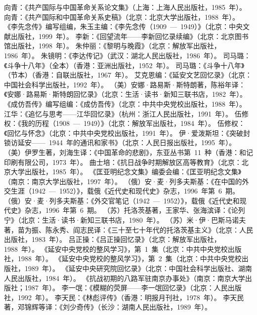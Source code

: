 \begin{thebibliography}{999}
\bibitem{}向青：《共产国际与中国革命关系论文集》（上海：上海人民出版社，1985~年）。
\bibitem{}向青：《共产国际和中国革命关系史稿》（北京：北京大学出版社，1988~年）。
\bibitem{}《李先念传》编写组编，朱玉主编：《李先念传（1909~—~1949）》（北京：中央文献出版社，1999~年）。
\bibitem{}李新：《回望流年——李新回忆录续编》（北京：北京图书馆出版社，1998~年）。
\bibitem{}朱仲丽：《黎明与晚霞》（北京：解放军出版社，1986~年）。
\bibitem{}朱镜明：《李达传记》（武汉：湖北人民出版社，1986~年）。
\bibitem{}司马璐：《斗争十八年》（全本）（香港：亚洲出版社，1952~年）。
\bibitem{}司马璐：《斗争十八年》（节本）（香港：自联出版社，1967~年）。
\bibitem{}艾克恩编：《延安文艺回忆录》（北京：中国社会科学出版社，1992~年）。
\bibitem{}（美）安娜·路易斯·斯特朗著，陈裕年译：《安娜·路易斯·斯特朗回忆录》（北京：生活·读书·新知三联书店，1982~年）。
\bibitem{}《成仿吾传》编写组编：《成仿吾传》（北京：中共中央党校出版社，1988~年）。
\bibitem{}江华：《追忆与思考——江华回忆录》（杭州：浙江人民出版社，1991~年）。
\bibitem{}伍修权：《我的历程（1908~—~1949）》（北京：解放军出版社，1984~年）。
\bibitem{}伍修权：《回忆与怀念》（北京：中共中央党校出版社，1991~年）。
\bibitem{}伊·爱泼斯坦：《突破封锁访延安——~1944~年的通讯和家书》（北京：人民日报出版社，1995~年）。
\bibitem{}（美）伊罗生著，刘海生译：《中国革命的悲剧》，东亚丛书第~11~种（香港：和记印刷有限公司，1973~年）。
\bibitem{}曲士培：《抗日战争时期解放区高等教育》（北京：北京大学出版社，1985~年）。
\bibitem{}《匡亚明纪念文集》编委会编：《匡亚明纪念文集》（南京：南京大学出版社，1997~年）。
\bibitem{}（俄）安·麦·列多夫斯基：《在中国的外交生涯（1942~—~1952）》，载俄《近代史和现代史》杂志，1996~年第~6~期。
\bibitem{}（俄）安·麦·列多夫斯基：《外交官笔记（1942~—~1952）》，载俄《近代史和现代史》杂志，1996~年第~6~期。
\bibitem{}（苏）托洛茨基著，王家华、张海滨译：《论列宁》（北京：生活·读书·新知三联书店，1980~年）。
\bibitem{}（苏）米·伊·巴斯马诺夫著，苗为振、陈永秀、阎志民译：《三十至七十年代的托洛茨基主义》（北京：人民出版社，1983~年）。
\bibitem{}吕正操：《吕正操回忆录》（北京：解放军出版社，1988~年）。
\bibitem{}《延安中央党校的整风学习》，第~1~集（北京：中共中央党校出版社，1988~年）。
\bibitem{}《延安中央党校的整风学习》，第~2~集（北京：中共中央党校出版社，1989~年）。
\bibitem{}《延安中央研究院回忆录》（北京：中国社会科学出版社、湖南人民出版社，1984~年）。
\bibitem{}《抗战初期的八路军驻南京办事处》（南京：南京大学出版社；1987~年）。
\bibitem{}李一氓：《模糊的荧屏——李一氓回忆录》（北京：人民出版社，1992~年）。
\bibitem{}李天民：《林彪评传》（香港：明报月刊社，1978~年）。
\bibitem{}李天民著，邓锦辉等译：《刘少奇传》（长沙：湖南人民出版社，1989~年）。

\end{thebibliography}
